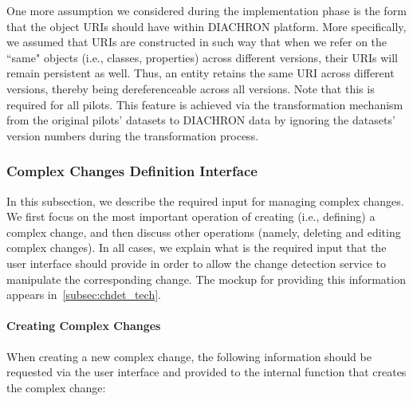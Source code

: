 One more assumption we considered during the implementation phase is the form that the object URIs should have within DIACHRON platform. More specifically, we assumed that URIs are constructed in such way that when we refer on the ``same" objects (i.e., classes, properties) across different versions, their URIs will remain persistent as well. 
Thus, an entity retains the same URI across different versions, thereby being dereferenceable across all versions. Note that this is required for all pilots.
This feature is achieved via the transformation mechanism from the original pilots' datasets to DIACHRON data by ignoring the datasets' version numbers during the transformation process.

\subsubsection{Complex Changes Definition Interface}
\label{subsubsec:complex}

In this subsection, we describe the required input for managing complex changes.
We first focus on the most important operation of creating (i.e., defining) a complex change, and then discuss other operations (namely, deleting and editing complex changes). In all cases, we explain what is the required input that the user interface should provide in order to allow the change detection service to manipulate the corresponding change. The mockup for providing this information appears in~\ref{subsec:chdet_tech}.

\paragraph{Creating Complex Changes}

When creating a new complex change, the following information should be requested via the user interface and provided to the internal function that creates the complex change:


